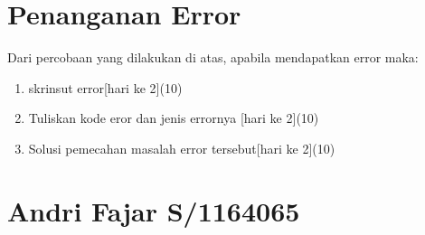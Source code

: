 \section{Penanganan Error}
Dari percobaan yang dilakukan di atas, apabila mendapatkan error maka:

\begin{enumerate}
	\item
	skrinsut error[hari ke 2](10)
	\item
Tuliskan kode eror dan jenis errornya [hari ke 2](10)
	\item
Solusi pemecahan masalah error tersebut[hari ke 2](10)

\end{enumerate}


\section{Andri Fajar S/1164065}
